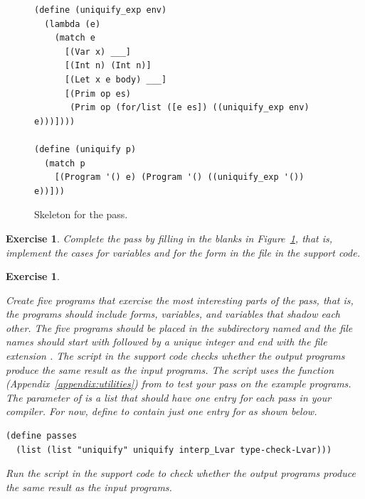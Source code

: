 \documentclass[7x10,nocrop]{TimesAPriori_MIT}%
\newtheorem{exercise}[theorem]{Exercise}
\begin{document}
{\begin{figure}[tbp]
\begin{lstlisting}
(define (uniquify_exp env)
  (lambda (e)
    (match e
      [(Var x) ___]
      [(Int n) (Int n)]
      [(Let x e body) ___]
      [(Prim op es)
       (Prim op (for/list ([e es]) ((uniquify_exp env) e)))])))

(define (uniquify p)
  (match p
    [(Program '() e) (Program '() ((uniquify_exp '()) e))]))
\end{lstlisting}
\caption{Skeleton for the  pass.}
\label{fig:uniquify-Lvar}
\end{figure}

\begin{exercise}
\normalfont\normalsize %

Complete the  pass by filling in the blanks in
Figure~\ref{fig:uniquify-Lvar}, that is, implement the cases for
variables and for the  form in the file 
in the support code.
\end{exercise}

\begin{exercise}
\normalfont\normalsize
\label{ex:Lvar}

Create five \LangVar{} programs that exercise the most interesting
parts of the  pass, that is, the programs should include
 forms, variables, and variables that shadow each other.
The five programs should be placed in the subdirectory named
 and the file names should start with 
followed by a unique integer and end with the file extension
.
%
The  script in the support code checks whether the
output programs produce the same result as the input programs.  The
script uses the  function
(Appendix~\ref{appendix:utilities}) from  to test
your  pass on the example programs.  The 
parameter of  is a list that should have one entry
for each pass in your compiler.  For now, define  to
contain just one entry for  as shown below.
\begin{lstlisting}
(define passes 
  (list (list "uniquify" uniquify interp_Lvar type-check-Lvar)))
\end{lstlisting}
Run the  script in the support code to check
whether the output programs produce the same result as the input
programs.
\end{exercise}

\fi}
\end{document}
